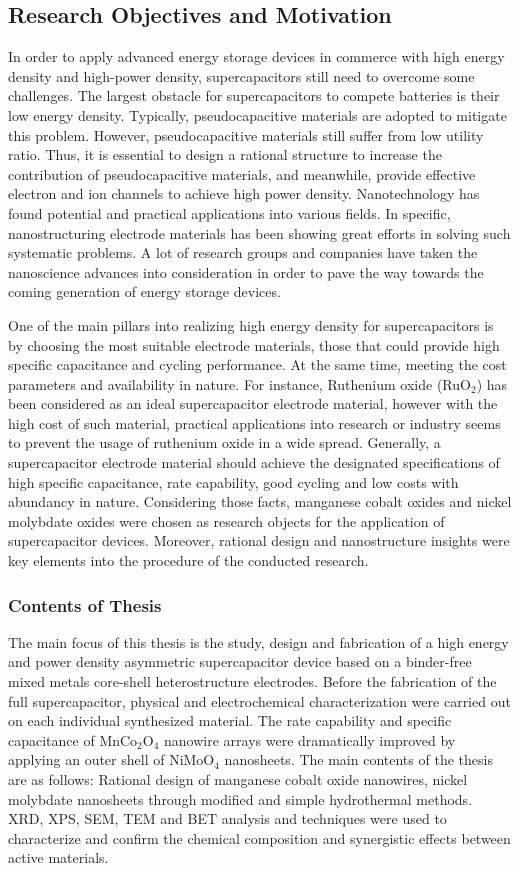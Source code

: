 \documentclass[reprint,amsmath,amssymb,aps,floatfix,
]{revtex4-2}
\begin{document}
\subsection{\label{sec:level3}Research Objectives and Motivation}
In order to apply advanced energy storage devices in commerce with high energy density and high-power density, supercapacitors still need to overcome some challenges. The largest obstacle for supercapacitors to compete batteries is their low energy density. Typically, pseudocapacitive materials are adopted to mitigate this problem. However, pseudocapacitive materials still suffer from low utility ratio. Thus, it is essential to design a rational structure to increase the contribution of pseudocapacitive materials, and meanwhile, provide effective electron and ion channels to achieve high power density. Nanotechnology has found potential and practical applications into various fields. In specific, nanostructuring electrode materials has been showing great efforts in solving such systematic problems. A lot of research groups and companies have taken the nanoscience advances into consideration in order to pave the way towards the coming generation of energy storage devices.

One of the main pillars into realizing high energy density for supercapacitors is by choosing the most suitable electrode materials, those that could provide high specific capacitance and cycling performance. At the same time, meeting the cost parameters and availability in nature. For instance, Ruthenium oxide (RuO$_2$) has been considered as an ideal supercapacitor electrode material, however with the high cost of such material, practical applications into research or industry seems to prevent the usage of ruthenium oxide in a wide spread. Generally, a supercapacitor electrode material should achieve the designated specifications of high specific capacitance, rate capability, good cycling and low costs with abundancy in nature. Considering those facts, manganese cobalt oxides and nickel molybdate oxides were chosen as research objects for the application of supercapacitor devices. Moreover, rational design and nanostructure insights were key elements into the procedure of the conducted research.
\subsubsection{Contents of Thesis}
The main focus of this thesis is the study, design and fabrication of a high energy and power density asymmetric supercapacitor device based on a binder-free mixed metals core-shell heterostructure electrodes. Before the fabrication of the full supercapacitor, physical and electrochemical characterization were carried out on each individual synthesized material. The rate capability and specific capacitance of MnCo$_2$O$_4$ nanowire arrays were dramatically improved by applying an outer shell of NiMoO$_4$ nanosheets. The main contents of the thesis are as follows: Rational design of manganese cobalt oxide nanowires, nickel molybdate nanosheets through modified and simple hydrothermal methods. XRD, XPS, SEM, TEM and BET analysis and techniques were used to characterize and confirm the chemical composition and synergistic effects between active materials.
\end{document}
